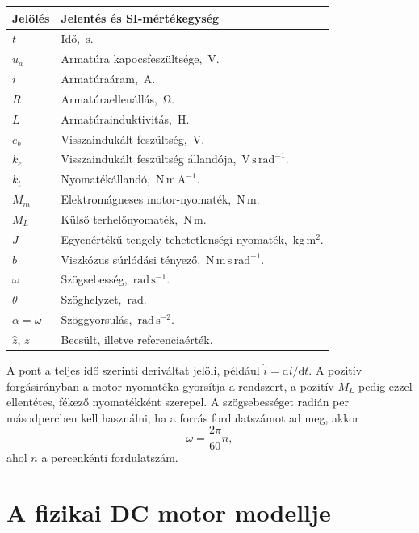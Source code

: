 \documentclass[11pt,a4paper]{article}
\renewcommand{\arraystretch}{1.15}
\newcommand{\dd}{\mathrm{d}}
\newcommand{\unit}[1]{\,\mathrm{#1}}
\begin{document}
\small
\renewcommand{\arraystretch}{1.0}
\setlength{\parskip}{0pt}
\begin{longtable}{>{\raggedright\arraybackslash}p{} >{\raggedright\arraybackslash}p{}}
\toprule
Jelölés & Jelentés és SI-mértékegység \\
\midrule
\endhead
$t$ & Idő, $\unit{s}$.\\
$u_a$ & Armatúra kapocsfeszültsége, $\unit{V}$.\\
$i$ & Armatúraáram, $\unit{A}$.\\
$R$ & Armatúraellenállás, $\unit{\Omega}$.\\
$L$ & Armatúrainduktivitás, $\unit{H}$.\\
$e_b$ & Visszaindukált feszültség, $\unit{V}$.\\
$k_e$ & Visszaindukált feszültség állandója, $\unit{V\,s\,rad^{-1}}$.\\
$k_t$ & Nyomatékállandó, $\unit{N\,m\,A^{-1}}$.\\
$M_m$ & Elektromágneses motor-nyomaték, $\unit{N\,m}$.\\
$M_L$ & Külső terhelőnyomaték, $\unit{N\,m}$.\\
$J$ & Egyenértékű tengely-tehetetlenségi nyomaték, $\unit{kg\,m^2}$.\\
$b$ & Viszkózus súrlódási tényező, $\unit{N\,m\,s\,rad^{-1}}$.\\
$\omega$ & Szögsebesség, $\unit{rad\,s^{-1}}$.\\
$\theta$ & Szöghelyzet, $\unit{rad}$.\\
$\alpha=\dot\omega$ & Szöggyorsulás, $\unit{rad\,s^{-2}}$.\\
$\hat{z}$, $z$ & Becsült, illetve referenciaérték.\\
\bottomrule
\end{longtable}
\normalsize
\renewcommand{\arraystretch}{1.15}
\setlength{\parskip}{5pt}

A pont a teljes idő szerinti deriváltat jelöli, például $\dot{i}=\dd i/\dd t$. A pozitív forgásirányban a motor nyomatéka gyorsítja a rendszert, a pozitív $M_L$ pedig ezzel ellentétes, fékező nyomatékként szerepel. A szögsebességet radián per másodpercben kell használni; ha a forrás fordulatszámot ad meg, akkor
\begin{equation}
  \omega = \frac{2\pi}{60}n,
  \label{eq:rpm}
\end{equation}
ahol $n$ a percenkénti fordulatszám.

\section{A fizikai DC motor modellje}
\end{document}
